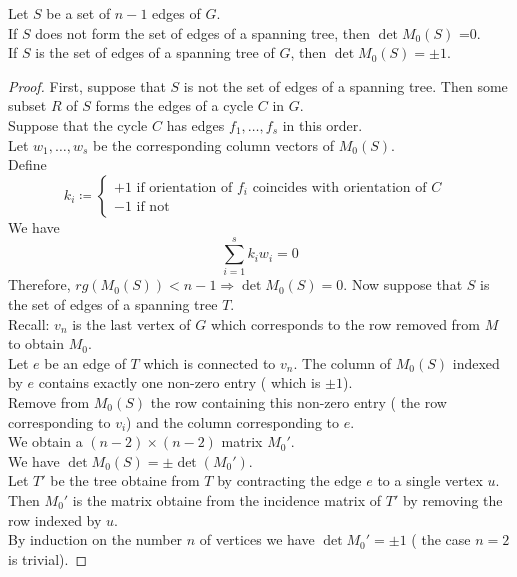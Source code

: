 \documentclass[../main.tex]{subfiles}
\begin{document}
\begin{lemma}
Let $S$ be a set of $n-1$ edges of $G$.\\
If $S$ does not form the set of edges of a spanning tree, then $\det M_0( S) $ =0.\\
If $S$ is the set of edges of a spanning tree of $G$, then $\det M_0( S) = \pm 1$.
\end{lemma}
\begin{proof}
First, suppose that $S$ is not the set of edges of a spanning tree. Then some subset $R$ of $S$ forms the edges of a cycle $C$ in $G$.\\
Suppose that the cycle $C$ has edges $f_1, \ldots, f_s$ in this order.\\
Let $w_1, \ldots, w_s$ be the corresponding column vectors of $M_0( S) $.\\
Define 
\[ 
k_i \coloneqq  
\begin{cases}
	+1 \text{ if orientation of $f_i$ coincides with orientation of $C$ }\\
	-1 \text{ if not } 
\end{cases}
\]
We have
\[ 
\sum_{i=1}^{ s}k_i w_i =0
\]
Therefore, $rg( M_0( S) ) < n-1 \Rightarrow \det M_0( S)=0. $
Now suppose that $S$ is the set of edges of a spanning tree $T$.\\
Recall: $v_n$ is the last vertex of $G$ which corresponds to the row removed from $M$ to obtain $M_0$.\\
Let $e$ be an edge of $T$ which is connected to $v_n$. The column of $M_0( S)$	indexed by $e$ contains exactly one non-zero entry ( which is $\pm 1$).\\
Remove from $M_0( S) $ the row containing this non-zero entry ( the row corresponding to $v_i$) and the column corresponding to $e$.\\
We obtain a $( n-2) \times ( n-2) $ matrix $M_0'$.\\
We have $\det M_0( S) = \pm \det ( M_0') $.\\
Let $T'$ be the tree obtaine from $T$ by contracting the edge $e$ to a single vertex $u$.\\
Then $M_0'$ is the matrix obtaine from the incidence matrix of $T'$ by removing the row indexed by $u$.\\
By induction on the number $n$ of vertices we have $\det M_0'= \pm 1$ (  the case $n=2$ is trivial).

	
\end{proof}
\end{document}
